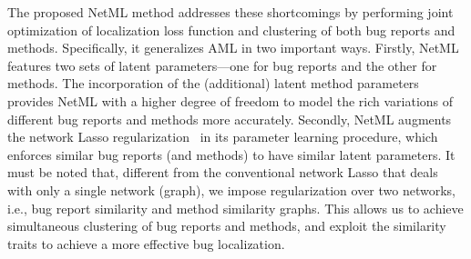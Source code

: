The proposed NetML method addresses these shortcomings by performing joint optimization of localization loss function and clustering of both bug reports and methods. Specifically, it generalizes AML in two important ways. Firstly, NetML features two sets of latent parameters---one for bug reports and the other for methods. The incorporation of the (additional) latent method parameters provides NetML with a higher degree of freedom to model the rich variations of different bug reports and methods more accurately. Secondly, NetML augments the network Lasso regularization~\cite{Hallac:2015:NLC:2783258.2783313} in its parameter learning procedure, which enforces similar bug reports (and methods) to have similar latent parameters. It must be noted that, different from the conventional network Lasso that deals with only a single network (graph), we impose regularization over two networks, i.e., bug report similarity and method similarity graphs. This allows us to achieve simultaneous clustering of bug reports and methods, and exploit the similarity traits to achieve a more effective bug localization.





